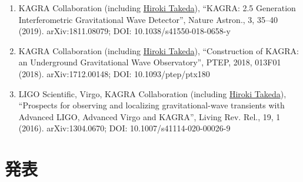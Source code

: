 \documentclass[uplatex, 11pt]{jsarticle}
\begin{document}
\begin{enumerate}
\item KAGRA Collaboration (including \uline{Hiroki Takeda}), “KAGRA: 2.5 Generation Interferometric Gravitational Wave Detector”, Nature Astron., 3, 35--40 (2019). arXiv:1811.08079; DOI: 10.1038/s41550-018-0658-y
\item KAGRA Collaboration (including \uline{Hiroki Takeda}), “Construction of KAGRA: an Underground Gravitational Wave Observatory”, PTEP, 2018, 013F01 (2018). arXiv:1712.00148; DOI: 10.1093/ptep/ptx180
\item LIGO Scientific, Virgo, KAGRA Collaboration (including \uline{Hiroki Takeda}), “Prospects for observing and localizing gravitational-wave transients with Advanced LIGO, Advanced Virgo and KAGRA”, Living Rev. Rel., 19, 1 (2016). arXiv:1304.0670; DOI: 10.1007/s41114-020-00026-9
\end{enumerate}


\section*{発表}
\end{document}
